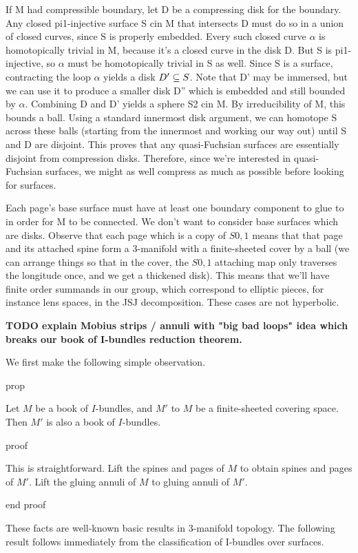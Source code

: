 If M had compressible boundary, let D be a compressing disk for the boundary.
Any closed pi1-injective surface S cin M that intersects D must do so in
a union of closed curves, since S is properly embedded. Every such closed curve
$\alpha$ is homotopically trivial in M, because it's a closed curve in the disk
D.  But S is pi1-injective, so $\alpha$ must be homotopically trivial in S as
well. Since S is a surface, contracting the loop $\alpha$ yields a disk $D'\subseteq
S$. Note that D' may be immersed, but we can use it to produce a smaller disk
D'' which is embedded and still bounded by $\alpha$. Combining D and D' yields
a sphere S2 cin M. By irreducibility of M, this bounds a ball. Using a standard
innermost disk argument, we can homotope S across these balls (starting from
the innermost and working our way out) until S and D are disjoint.  This proves
that any quasi-Fuchsian surfaces are essentially disjoint from compression
disks. Therefore, since we're interested in quasi-Fuchsian surfaces, we might
as well compress as much as possible before looking for surfaces.

Each page's base surface must have at least one boundary component to glue to
in order for M to be connected. We don't want to consider base surfaces which
are disks.  Observe that each page which is a copy of $S0,1$ means that that
page and its attached spine form a 3-manifold with a finite-sheeted cover by
a ball (we can arrange things so that in the cover, the $S0,1$ attaching map
only traverses the longitude once, and we get a thickened disk).  This means
that we'll have finite order summands in our group, which correspond to
elliptic pieces, for instance lens spaces, in the JSJ decomposition. These
cases are not hyperbolic.

\textbf{TODO explain Mobius strips / annuli with "big bad loops" idea which
breaks our book of I-bundles reduction theorem.}

We first make the following simple observation.

prop

Let $M$ be a book of $I$-bundles, and $M'$ to $M$ be a finite-sheeted covering
space.  Then $M'$ is also a book of $I$-bundles.

proof

This is straightforward. Lift the spines and pages of $M$ to obtain spines and
pages of $M'$. Lift the gluing annuli of $M$ to gluing annuli of $M'$.

end proof

These facts are well-known basic results in 3-manifold topology.  The following
result follows immediately from the classification of I-bundles over surfaces.

